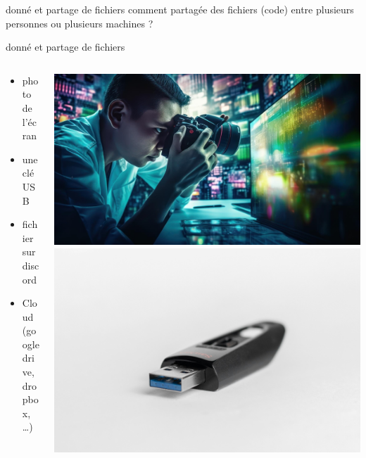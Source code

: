 \documentclass[usenames,dvipsnames]{beamer}
\begin{document}
\begin{frame}[fragile]{donné et partage de fichiers}
	comment partagée des fichiers (code) entre plusieurs personnes ou plusieurs machines ?
\end{frame}

\begin{frame}[fragile]{donné et partage de fichiers}
	\begin{columns}
		\begin{column}{0.5\linewidth}
			\begin{itemize}
				\item<1-> photo de l'écran
				\item<2-> une clé USB
				\item<3-> fichier sur discord
				\item<4-> Cloud (google drive, dropbox, \dots)
			\end{itemize}
		\end{column}
		\begin{column}{0.5\linewidth}
			\begin{overprint}
				\includegraphics[width=\linewidth]{Im/taking_picture_sreen.jpeg}
				\onslide<2>\includegraphics[width=\linewidth]{Im/thumb_drive.jpg}

\end{overprint}
\end{column}
\end{columns}
\end{frame}
\end{document}
